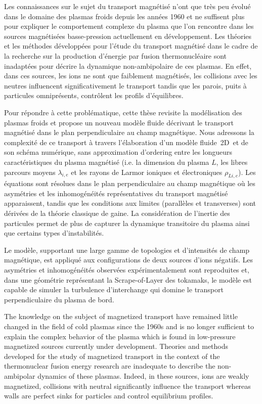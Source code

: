 \thispagestyle{preface}
Les connaissances sur le sujet du transport magnétisé n'ont que très peu évolué
dans le domaine des plasmas froids depuis les années 1960 et ne suffisent plus
pour expliquer le comportement complexe du plasma que l'on
rencontre dans les sources magnétisées basse-pression actuellement en développement.
Les théories et les méthodes développées pour l'étude du transport magnétisé
dans le cadre de la recherche sur la production d'énergie par fusion
thermonucléaire sont inadaptées pour décrire la dynamique non-ambipolaire de ces
plasmas. En effet, dans ces sources, les ions ne sont que faiblement magnétisés,
les collisions avec les neutres influencent significativement le transport
tandis que les parois, puits à particules omniprésents, contrôlent les profils
d'équilibres.

Pour répondre à cette problématique, cette thèse revisite la modélisation
des plasmas froids et propose un nouveau modèle fluide décrivant le transport
magnétisé dans le plan perpendiculaire au champ magnétique.		
Nous adressons la complexité de ce transport à travers l’élaboration d'un modèle
fluide~2D\textonehalf ~et de son schéma numérique, sans approximation d'ordering
entre les longueurs caractéristiques du plasma magnétisé (i.e. la dimension du
plasma $L$, les libres parcours moyens $\lambda_{i,e}$ et les rayons
de Larmor ioniques et électroniques $\rho_{Li,e}$).
Les équations sont résolues dans le plan perpendiculaire au champ magnétique où
les asymétries et les inhomogénéités représentatives du transport magnétisé
apparaissent, tandis que les conditions aux limites (parallèles et transverses)
sont dérivées de la théorie classique de gaine. La considération de l'inertie
des particules permet de plus de capturer la dynamique transitoire du plasma
ainsi que certains types d'instabilités.
		
Le modèle, supportant une large gamme de topologies et d'intensités de champ
magnétique, est appliqué aux configurations de deux sources d'ions négatifs. 
Les asymétries et inhomogénéités observées expérimentalement sont reproduites
et, dans une géométrie représentant la Scrape-of-Layer des tokamaks, le modèle
est capable de simuler la turbulence d'interchange qui domine le transport
perpendiculaire du plasma de bord.
\newpage
		\thispagestyle{empty}
\cleardoublepage
		\thispagestyle{preface}	
The knowledge on the subject of magnetized transport have remained little changed
in the field of cold plasmas since the 1960s and is no longer sufficient
to explain the complex behavior of the plasma which is
found in low-pressure magnetized sources currently under development.
Theories and methods developed for the study of magnetized transport
in the context of the thermonuclear fusion energy research 
are inadequate to describe the non-ambipolar dynamics of these
plasmas. Indeed, in these sources, ions are weakly magnetized,
collisions with neutral significantly influence the transport whereas
walls are perfect sinks for particles and control equilibrium profiles.

